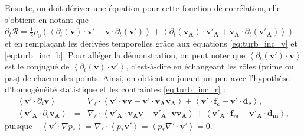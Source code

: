 Ensuite, on doit dériver une équation pour cette fonction de corrélation, elle s'obtient en notant que $\partial_t \mathcal{R} = \frac{1}{2} \rho_0 (\left<\partial_t(\boldsymbol{v}) \cdot \boldsymbol{v'} + \boldsymbol{v} \cdot \partial_t(\boldsymbol{v'}) \right> + \left<\partial_t(\boldsymbol{v_A}) \cdot \boldsymbol{v'_A} + \boldsymbol{v_A} \cdot \partial_t(\boldsymbol{v'_A}) \right>)$ et en remplaçant les dérivées temporelles grâce aux équations \eqref{eq:turb_inc_v} et \eqref{eq:turb_inc_b}. Pour alléger la démonstration, on peut noter que $\left<\partial_t(\boldsymbol{v'}) \cdot \boldsymbol{v}\right> $ est le conjugué de $\left<\partial_t(\boldsymbol{v}) \cdot \boldsymbol{v'}\right> $, c'est-à-dire en échangeant les rôles (prime ou pas) de chacun des points. Ainsi, on obtient en jouant un peu avec l'hypothèse d'homogénéité statistique et les contraintes \eqref{eq:turb_inc_r} : 
\begin{eqnarray}
\label{eq:turb_inc_v1} \left<\boldsymbol{v'} \cdot \partial_t \boldsymbol{v}\right> &=&  \nabla_{\boldsymbol{\ell}} \cdot \left< \boldsymbol{v'} \cdot \boldsymbol{v}\boldsymbol{v}-\boldsymbol{v'} \cdot \boldsymbol{v_A}   \boldsymbol{v_A}\right> +  \left<\boldsymbol{v'} \cdot \boldsymbol{f_c}+\boldsymbol{v'} \cdot \boldsymbol{d_c}\right> ,\\
\label{eq:turb_inc_b1}\left<\boldsymbol{v'_A} \cdot \partial_t \boldsymbol{v_A}\right> &=& \nabla_{\boldsymbol{\ell}} \cdot \left< \boldsymbol{v'_A} \cdot \boldsymbol{v_A}\boldsymbol{v}-\boldsymbol{v'_A} \cdot \boldsymbol{v}\boldsymbol{v_A}\right>  +  \left<\boldsymbol{v'_A} \cdot \boldsymbol{f_m}+\boldsymbol{v'_A} \cdot \boldsymbol{d_m}\right>,
\end{eqnarray}
puisque $ - \left<\boldsymbol{v'} \cdot \nabla p_*\right> = \nabla_{\boldsymbol{\ell}} \cdot \left< p_* \boldsymbol{v'}\right> = \left<p_* \nabla' \cdot \boldsymbol{v'}\right> = 0$. 

